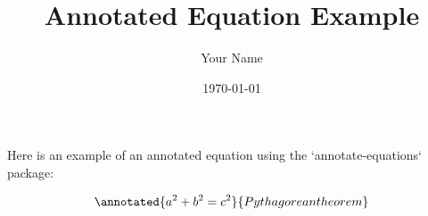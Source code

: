 \documentclass{article}
\begin{document}
\title{Annotated Equation Example}
\author{Your Name}
\date{\today}
\maketitle

Here is an example of an annotated equation using the `annotate-equations` package:

\begin{equation}
    \annotated{a^2 + b^2 = c^2}{Pythagorean theorem}
\end{equation}

\end{document}
